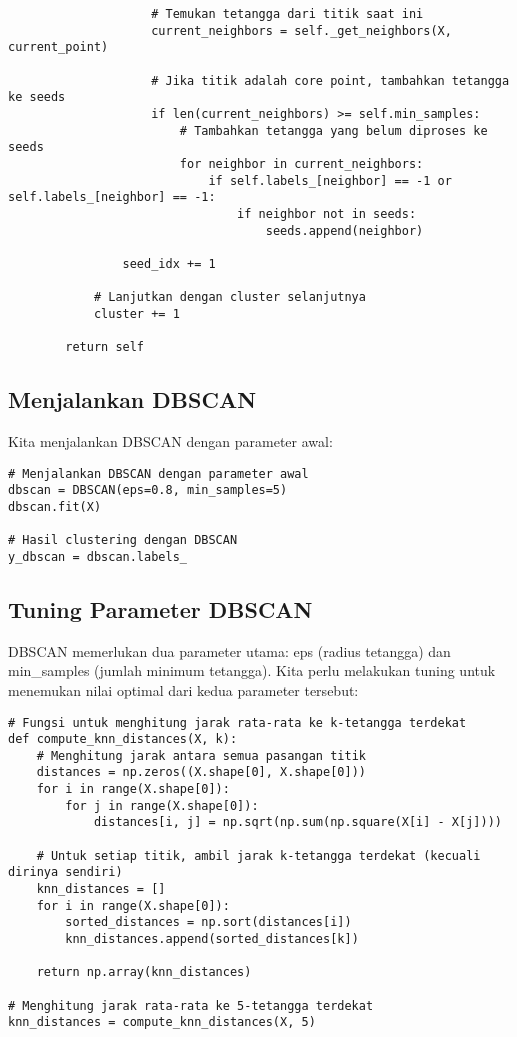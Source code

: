 \documentclass[a4paper,12pt]{article}
\begin{document}
\begin{lstlisting}
                    # Temukan tetangga dari titik saat ini
                    current_neighbors = self._get_neighbors(X, current_point)
                    
                    # Jika titik adalah core point, tambahkan tetangga ke seeds
                    if len(current_neighbors) >= self.min_samples:
                        # Tambahkan tetangga yang belum diproses ke seeds
                        for neighbor in current_neighbors:
                            if self.labels_[neighbor] == -1 or self.labels_[neighbor] == -1:
                                if neighbor not in seeds:
                                    seeds.append(neighbor)
                
                seed_idx += 1
                
            # Lanjutkan dengan cluster selanjutnya
            cluster += 1
            
        return self
\end{lstlisting}

\subsection{Menjalankan DBSCAN}
Kita menjalankan DBSCAN dengan parameter awal:
\begin{lstlisting}
# Menjalankan DBSCAN dengan parameter awal
dbscan = DBSCAN(eps=0.8, min_samples=5)
dbscan.fit(X)

# Hasil clustering dengan DBSCAN
y_dbscan = dbscan.labels_
\end{lstlisting}

\subsection{Tuning Parameter DBSCAN}
DBSCAN memerlukan dua parameter utama: eps (radius tetangga) dan min\_samples (jumlah minimum tetangga). Kita perlu melakukan tuning untuk menemukan nilai optimal dari kedua parameter tersebut:

\begin{lstlisting}
# Fungsi untuk menghitung jarak rata-rata ke k-tetangga terdekat
def compute_knn_distances(X, k):
    # Menghitung jarak antara semua pasangan titik
    distances = np.zeros((X.shape[0], X.shape[0]))
    for i in range(X.shape[0]):
        for j in range(X.shape[0]):
            distances[i, j] = np.sqrt(np.sum(np.square(X[i] - X[j])))
    
    # Untuk setiap titik, ambil jarak k-tetangga terdekat (kecuali dirinya sendiri)
    knn_distances = []
    for i in range(X.shape[0]):
        sorted_distances = np.sort(distances[i])
        knn_distances.append(sorted_distances[k])
    
    return np.array(knn_distances)

# Menghitung jarak rata-rata ke 5-tetangga terdekat
knn_distances = compute_knn_distances(X, 5)
\end{lstlisting}
\end{document}
